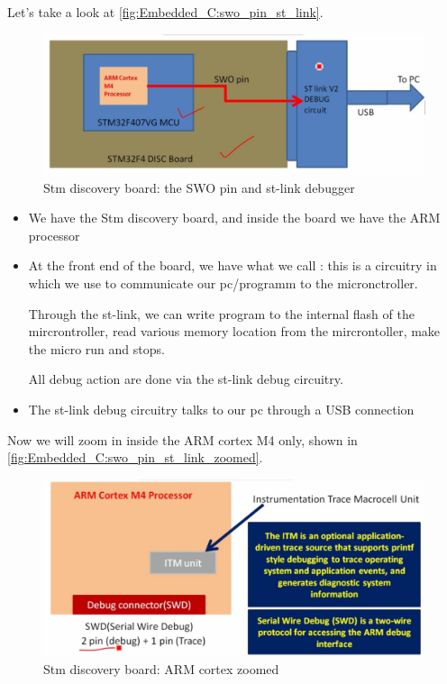 Let's take a look at \autoref{fig:Embedded_C:swo_pin_st_link}. 

\begin{figure}[h]
\centering
\includegraphics[scale=0.5]{Figures/Embedded_C/swo_pin_st_link}
\caption{Stm discovery board: the SWO pin and st-link debugger}
\label{fig:Embedded_C:swo_pin_st_link}
\end{figure}  

\begin{itemize}
    \item We have the Stm discovery board, and inside the board we have the ARM processor
    
    \item At the front end of the board, we have what we call : this is a circuitry in which we use to communicate our pc/programm to the micronctroller.
    
    Through the st-link, we can write program to the internal flash of the mircrontroller, read various memory location from the mircrontoller, make the micro run and stops.
    
    All debug action are done via the st-link debug circuitry.
    
    \item The st-link debug circuitry talks to our pc through a USB connection
    
    
\end{itemize}

Now we will zoom in inside the ARM cortex M4 only, shown in \autoref{fig:Embedded_C:swo_pin_st_link_zoomed}.

\begin{figure}[h]
\centering
\includegraphics[scale=0.5]{Figures/Embedded_C/swo_pin_st_link_zoomed}
\caption{Stm discovery board: ARM cortex zoomed}
\label{fig:Embedded_C:swo_pin_st_link_zoomed}
\end{figure}  


